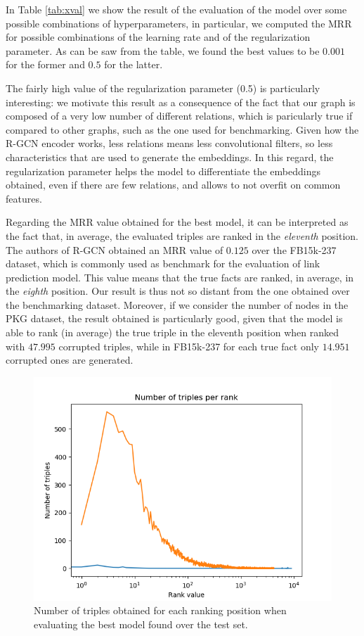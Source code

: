 \documentclass[%
    corpo=13.5pt,
    twoside,
    oldstyle,
    tipotesi=magistrale,
    greek,
    evenboxes
]{toptesi}
\begin{document}
In Table \ref{tab:xval} we show the result of the evaluation of the model over
some possible combinations of hyperparameters, in particular, we computed the
MRR for possible combinations of the learning rate and of the regularization
parameter.
As can be saw from the table, we found the best values to be $0.001$ for the
former and $0.5$ for the latter.

The fairly high value of the regularization parameter (0.5) is particularly
interesting: we motivate this result as a consequence of the fact that our
graph is composed of a very low number of different relations, which is
paricularly true if compared to other graphs, such as the one used
for benchmarking.
Given how the R-GCN encoder works, less relations means less convolutional
filters, so less characteristics that are used to generate the embeddings.
In this regard, the regularization parameter helps the model to differentiate
the embeddings obtained, even if there are few relations, and allows to
not overfit on common features.

Regarding the MRR value obtained for the best model, it can be interpreted as
the fact that, in average, the evaluated triples are ranked in the
\emph{eleventh} position.
The authors of R-GCN obtained an MRR value of $0.125$ over the FB15k-237
dataset, which is commonly used as benchmark for the evaluation of link
prediction model. This value means that the true facts are ranked, in average,
in the \emph{eighth} position. Our result is thus not so distant from the one
obtained over the benchmarking dataset.
Moreover, if we consider the number of nodes in the PKG dataset, the result
obtained is particularly good, given that the model is able to rank
(in average) the true triple in the eleventh position when ranked with $47.995$
corrupted triples, while in FB15k-237 for each true fact only
$14.951$ corrupted ones are generated.

\begin{figure}[h]
    \centering
    \includegraphics[scale=0.8]{img/num_triples_per_rank.png}
    \caption{
        Number of triples obtained for each ranking position when evaluating
        the best model found over the test set.
    }
    \label{fig:num-triples-per-rank}
\end{figure}
\end{document}
